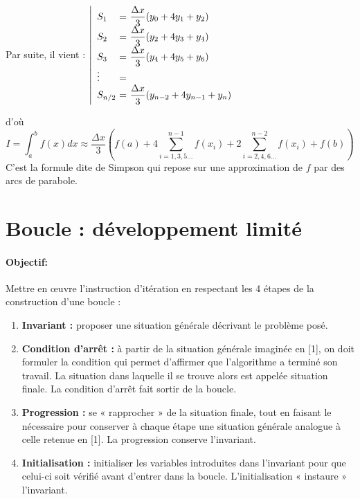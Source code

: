 \documentclass[11pt,a4paper,colorlinks,breaklinks]{article}
\begin{document}
\begin{enumerate}
	Par suite, il vient :
	$\displaystyle\left|\begin{array}{l@{\ =\ }l}
	S_1     & \displaystyle \frac{\Delta x}{3}(y_0 + 4y_1 + y_2)\\
	S_2     & \displaystyle \frac{\Delta x}{3}(y_2 + 4y_3 + y_4)\\
	S_3     & \displaystyle \frac{\Delta x}{3}(y_4 + 4y_5 + y_6)\\
	\vdots  \\
	\displaystyle S_{n/2} & \displaystyle \frac{\Delta x}{3}(y_{n-2} + 4y_{n-1} + y_n)
	\end{array}\right.$ 
	
	d'où
	$$I = \int_a^b f(x)dx \approx \frac{\Delta x}{3}
	\left(f(a) + 4\sum_{i=1,3,5...}^{n-1}f(x_i) + 2\sum_{i=2,4,6...}^{n-2}f(x_i) + f(b)\right)$$
	C'est la formule dite de Simpson qui repose sur une approximation de $f$ 
	par des arcs de parabole.
\end{enumerate}

\newpage
\section{Boucle : développement limité}\label{maths:boucle}
\paragraph{Objectif:} Mettre en \oe uvre l'instruction d'itération
	en respectant les 4 étapes de la construction d'une boucle :
	\begin{enumerate}
	\item {\bf Invariant :} proposer une situation générale décrivant le problème posé. 
	\item {\bf Condition d'arrêt :} à  partir de la situation générale imaginée en [1], 
		on doit formuler la condition qui permet d'affirmer que l'algorithme a 
		terminé son travail. 
		La situation dans laquelle il se trouve alors est appelée situation finale.
		La condition d'arrêt fait sortir de la boucle.
	\item {\bf Progression :} se « rapprocher » de la situation finale, tout en faisant 
		le nécessaire pour conserver à  chaque étape une situation générale 
		analogue à  celle retenue en [1].
		La progression conserve l'invariant.
	\item {\bf Initialisation :} initialiser les variables introduites dans l'invariant 
		pour que celui-ci soit vérifié avant d'entrer dans la boucle.
		L'initialisation « instaure » l'invariant.
	\end{enumerate}
\end{document}

